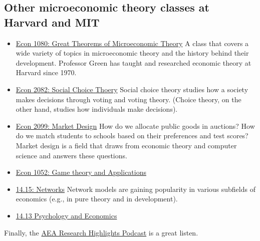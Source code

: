 \subsection*{Other microeconomic theory classes at Harvard and MIT}
\begin{itemize}
    \item \href{https://canvas.harvard.edu/courses/91911}{Econ 1080: Great Theorems of Microeconomic Theory} A class that covers a wide variety of topics in microeconomic theory and the history behind their development. Professor Green has taught and researched economic theory at Harvard since 1970.
    \item \href{https://canvas.harvard.edu/courses/73987/assignments/syllabus}{Econ 2082: Social Choice Thoery} Social choice theory studies how a society makes decisions through voting and voting theory. (Choice theory, on the other hand, studies how individuals make decisions).
    \item \href{https://canvas.harvard.edu/courses/60607}{Econ 2099: Market Design} How do we allocate public goods in auctions? How do we match students to schools based on their preferences and test scores? Market design is a field that draws from economic theory and computer science and answers these questions. 
    \item \href{https://canvas.harvard.edu/courses/85061}{Econ 1052: Game theory and Applications}
    \item \href{https://ocw.mit.edu/courses/14-15j-networks-spring-2018/}{14.15: Networks} Network models are gaining popularity in various subfields of economics (e.g., \citet{localbayesian} in pure theory and \citet{gossip} in development).
    \item \href{https://ocw.mit.edu/courses/14-13-psychology-and-economics-spring-2020/}{14.13 Psychology and Economics}
\end{itemize}

Finally, the \href{https://www.aeaweb.org/research/podcasts}{AEA Research Highlights Podcast} is a great listen. 

